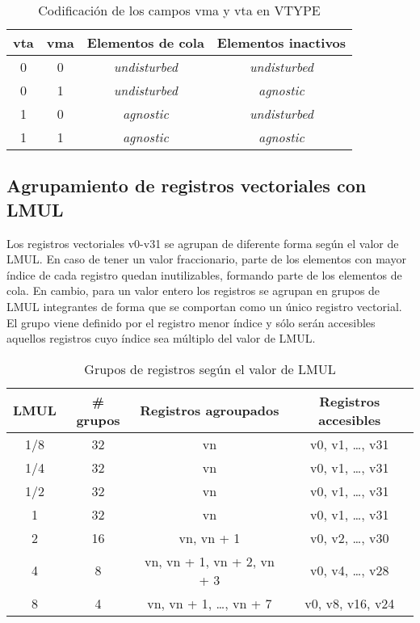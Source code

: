 \begin{table}[H]
    \begin{tabular}{@{}cccc@{}}
    \toprule
    vta & vma & Elementos de cola & Elementos inactivos\\
    \midrule
    0 & 0 & \textit{undisturbed} & \textit{undisturbed}\\
    0 & 1 & \textit{undisturbed} & \textit{agnostic}\\
    1 & 0 & \textit{agnostic} & \textit{undisturbed}\\
    1 & 1 & \textit{agnostic} & \textit{agnostic}\\
    \bottomrule
    \end{tabular}
    \caption{Codificación de los campos vma y vta  en VTYPE}
\end{table}


\subsection{Agrupamiento de registros vectoriales con LMUL}\label{mapping-registers-with-lmul}

Los registros vectoriales v0-v31 se agrupan de diferente forma según el valor
de LMUL. En caso de tener un valor fraccionario, parte de los elementos con mayor índice de cada registro quedan
inutilizables, formando parte de los elementos de cola. En cambio, para un valor entero
los registros se agrupan en grupos de LMUL integrantes de forma que se comportan como un
único registro vectorial. El grupo viene definido por el registro menor índice
y sólo serán accesibles aquellos registros cuyo índice sea múltiplo del valor
de LMUL\@.

\begin{table}[H]
    \begin{tabular}{@{}cccc@{}}
    \toprule
    LMUL & \# grupos & Registros agroupados & Registros accesibles\\
    \midrule
    1/8 & 32 & vn & v0, v1, \dots, v31\\
    1/4 & 32 & vn & v0, v1, \dots, v31\\
    1/2 & 32 & vn & v0, v1, \dots, v31\\
    1   & 32 & vn & v0, v1, \dots, v31\\
    2   & 16 & vn, vn + 1 & v0, v2, \dots, v30\\
    4   & 8  & vn, vn + 1, vn + 2, vn + 3 & v0, v4, \dots, v28\\
    8   & 4  & vn, vn + 1, \dots, vn + 7  & v0, v8, v16, v24\\
    \bottomrule
    \end{tabular}
    \caption{Grupos de registros según el valor de LMUL}
\end{table}

